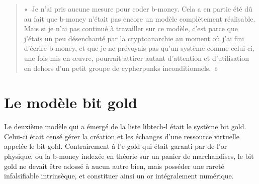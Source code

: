 \begin{quote}
«~Je n'ai pris aucune mesure pour coder b-money. Cela a en partie été dû au fait que b-money n'était pas encore un modèle complètement réalisable. Mais si je n'ai pas continué à travailler sur ce modèle, c'est parce que j'étais un peu désenchanté par la cryptoanarchie au moment où j'ai fini d'écrire b-money, et que je ne prévoyais pas qu'un système comme celui-ci, une fois mis en œuvre, pourrait attirer autant d'attention et d'utilisation en dehors d'un petit groupe de cypherpunks inconditionnels.~»
\end{quote}


\section*{Le modèle bit gold} %

Le deuxième modèle qui a émergé de la liste libtech-l était le système bit gold. Celui-ci était censé gérer la création et les échanges d'une ressource virtuelle appelée le bit gold. Contrairement à l'e-gold qui était garanti par de l'or physique, ou la b-money indexée en théorie sur un panier de marchandises, le bit gold ne devait être adossé à aucun autre bien, mais posséder une rareté infalsifiable intrinsèque, et constituer ainsi un or intégralement numérique. %

